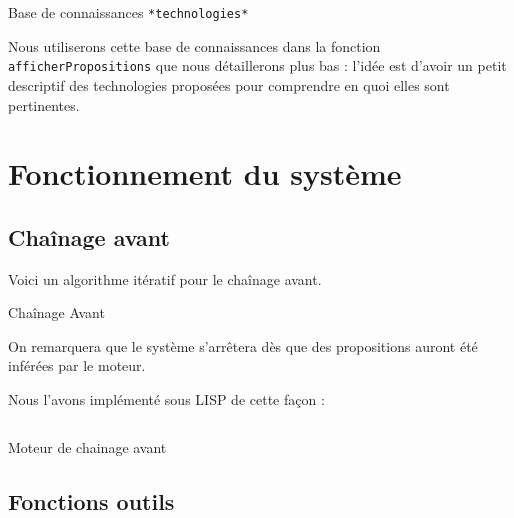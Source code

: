 \documentclass[a4paper,12pt]{article}
\begin{document}
\begin{listing}[H]
	\centering
	\inputminted[breaklines=true,linenos,firstline=27]{lisp}{../technologies.lisp}
	\caption{Base de connaissances \texttt{*technologies*}}
\end{listing}

Nous utiliserons cette base de connaissances dans la fonction \texttt{afficherPropositions} que nous détaillerons plus bas : l'idée est d'avoir un petit descriptif des technologies proposées pour comprendre en quoi elles sont pertinentes.


\section{Fonctionnement du système}

\subsection{Chaînage avant}

Voici un algorithme itératif pour le chaînage avant.
\begin{algorithm}
\caption{Chaînage Avant \label{algoChainageAvant}}
\end{algorithm}

On remarquera que le système s'arrêtera dès que des propositions auront été inférées par le moteur.


Nous l'avons implémenté sous LISP de cette façon :

\begin{listing}[H]
	\centering
	\inputminted[breaklines=true,linenos]{lisp}{../chainageAvantLarg.lisp}
	\caption{Moteur de chainage avant}
\end{listing}

\subsection{Fonctions outils}
\end{document}
